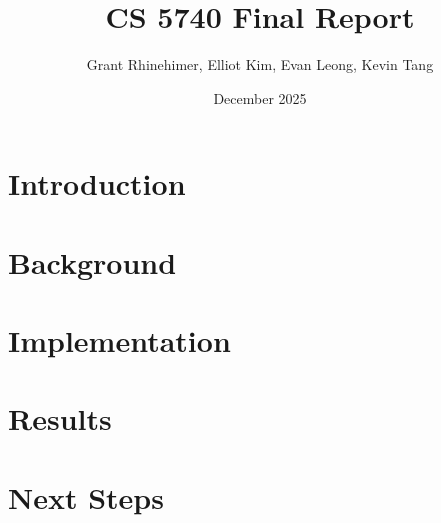 \documentclass{article}
\title{CS 5740 Final Report}
\author{Grant Rhinehimer, Elliot Kim, Evan Leong, Kevin Tang}
\date{December 2025}
\begin{document}
\maketitle

\section{Introduction}


\section{Background}


\section{Implementation}


\section{Results}

\section{Next Steps}
\end{document}
